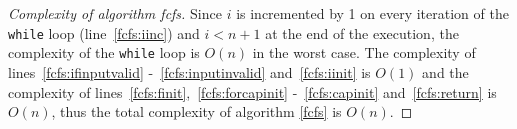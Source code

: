 \begin{proof}[Complexity of algorithm fcfs]
   Since $i$ is incremented by 1 on every iteration of the \texttt{while} loop (line~\ref{fcfs:iinc}) and $i < n+1$ at the
   end of the execution, the complexity of the \texttt{while} loop is $O(n)$ in the worst case. The complexity of
   lines~\ref{fcfs:ifinputvalid} -~\ref{fcfs:inputinvalid} and~\ref{fcfs:iinit} is $O(1)$ and the complexity of
   lines~\ref{fcfs:finit},~\ref{fcfs:forcapinit} -~\ref{fcfs:capinit} and~\ref{fcfs:return} is $O(n)$, thus the total
   complexity of algorithm \ref{fcfs} is $O(n)$.
\end{proof}
